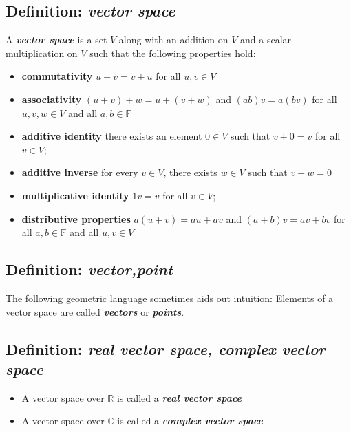 \documentclass{report}
\begin{document}
\subsection{Definition: \textbf{\textit{vector space}}}
A \textbf{\textit{vector space}} is a set $V$ along with an addition on $V$ and a scalar multiplication on $V$ such that the following properties hold:
\begin{itemize}
	\item \textbf{commutativity}\newline
   		$u+v=v+u$ for all $u,v \in V$ 
    \item \textbf{associativity}\newline
    	$(u+v)+w=u+(v+w)$ and $(ab)v=a(bv)$ for all $u,v,w \in V$ and all $a,b \in \mathbb{F}$
    \item \textbf{additive identity}\newline
    	there exists an element $0 \in V$ such that $v+0=v$ for all $v \in V$;
    \item \textbf{additive inverse}\newline
    	for every $v \in V$, there exists $w \in V$ such that $v+w=0$
    \item \textbf{multiplicative identity}\newline
    	$1v=v$ for all $v \in V$;
    \item \textbf{distributive properties}\newline
    	$a(u+v)=au+av$ and $(a+b)v=av+bv$ for all $a,b \in \mathbb{F}$ and all $u,v \in V$
\end{itemize}

\subsection{Definition: \textbf{\textit{vector,point}}}
The following geometric language sometimes aids out intuition:\newline
Elements of a vector space are called \textbf{\textit{vectors}} or \textbf{\textit{points}}.

\subsection{Definition: \textbf{\textit{real vector space, complex vector space}}}
\begin{itemize}
	\item A vector space over $\mathbb{R}$ is called a \textbf{\textit{real vector space}}
    \item A vector space over $\mathbb{C}$ is called a \textbf{\textit{complex vector space}}
\end{itemize}
\end{document}
